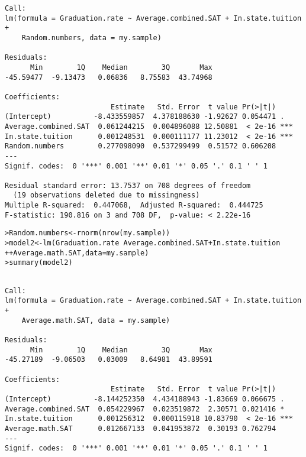 \documentclass{beamer}\usepackage[]{graphicx}\usepackage[]{color}
\makeatletter
\newcommand{\hlopt}[1]{\textcolor[rgb]{1,0.894,0.769}{#1}}%
\newcommand{\hlstd}[1]{\textcolor[rgb]{1,0.894,0.769}{#1}}%
\newcommand{\hlkwb}[1]{\textcolor[rgb]{0.804,0.776,0.451}{#1}}%
\newcommand{\hlkwc}[1]{\textcolor[rgb]{0.78,0.941,0.545}{#1}}%
\newcommand{\hlkwd}[1]{\textcolor[rgb]{1,0.78,0.769}{#1}}%
\newenvironment{kframe}{%
 \def\at@end@of@kframe{}%
 \ifinner\ifhmode%
  \def\at@end@of@kframe{\end{minipage}}%
  \begin{minipage}{\columnwidth}%
 \fi\fi%
 \def\FrameCommand##1{\hskip\@totalleftmargin \hskip-\fboxsep
 \colorbox{shadecolor}{##1}\hskip-\fboxsep
     \hskip-\linewidth \hskip-\@totalleftmargin \hskip\columnwidth}%
 \MakeFramed {\advance\hsize-\width
   \@totalleftmargin\z@ \linewidth\hsize
   \@setminipage}}%
 {\par\unskip\endMakeFramed%
 \at@end@of@kframe}
\newenvironment{knitrout}{}{} %
\makeatother
\begin{document}
\begin{darkframes}
\begin{frame}[fragile]
\begin{knitrout}
\begin{kframe}
\begin{verbatim}
Call:
lm(formula = Graduation.rate ~ Average.combined.SAT + In.state.tuition + 
    Random.numbers, data = my.sample)

Residuals:
      Min        1Q    Median        3Q       Max 
-45.59477  -9.13473   0.06836   8.75583  43.74968 

Coefficients:
                         Estimate   Std. Error  t value Pr(>|t|)    
(Intercept)          -8.433559857  4.378188630 -1.92627 0.054471 .  
Average.combined.SAT  0.061244215  0.004896088 12.50881  < 2e-16 ***
In.state.tuition      0.001248531  0.000111177 11.23012  < 2e-16 ***
Random.numbers        0.277098090  0.537299499  0.51572 0.606208    
---
Signif. codes:  0 '***' 0.001 '**' 0.01 '*' 0.05 '.' 0.1 ' ' 1

Residual standard error: 13.7537 on 708 degrees of freedom
  (19 observations deleted due to missingness)
Multiple R-squared:  0.447068,	Adjusted R-squared:  0.444725 
F-statistic: 190.816 on 3 and 708 DF,  p-value: < 2.22e-16
\end{verbatim}
\end{kframe}
\end{knitrout}
    \end{frame}

    \begin{frame}[fragile]
      \fontsize{8}{8}
\begin{knitrout}
\begin{kframe}
\begin{alltt}
\hlstd{> }\hlstd{Random.numbers} \hlkwb{<-} \hlkwd{rnorm}\hlstd{(}\hlkwd{nrow}\hlstd{(my.sample))}
\hlstd{> }\hlstd{model2} \hlkwb{<-} \hlkwd{lm}\hlstd{(Graduation.rate} \hlopt{~} \hlstd{Average.combined.SAT} \hlopt{+} \hlstd{In.state.tuition}
\hlstd{+ }               \hlopt{+} \hlstd{Average.math.SAT,} \hlkwc{data}\hlstd{=my.sample)}
\hlstd{> }\hlkwd{summary}\hlstd{(model2)}
\end{alltt}
\begin{verbatim}

Call:
lm(formula = Graduation.rate ~ Average.combined.SAT + In.state.tuition + 
    Average.math.SAT, data = my.sample)

Residuals:
      Min        1Q    Median        3Q       Max 
-45.27189  -9.06503   0.03009   8.64981  43.89591 

Coefficients:
                         Estimate   Std. Error  t value Pr(>|t|)    
(Intercept)          -8.144252350  4.434188943 -1.83669 0.066675 .  
Average.combined.SAT  0.054229967  0.023519872  2.30571 0.021416 *  
In.state.tuition      0.001256312  0.000115918 10.83790  < 2e-16 ***
Average.math.SAT      0.012667133  0.041953872  0.30193 0.762794    
---
Signif. codes:  0 '***' 0.001 '**' 0.01 '*' 0.05 '.' 0.1 ' ' 1


\end{verbatim}
\end{kframe}
\end{knitrout}
\end{frame}
\end{darkframes}
\end{document}
